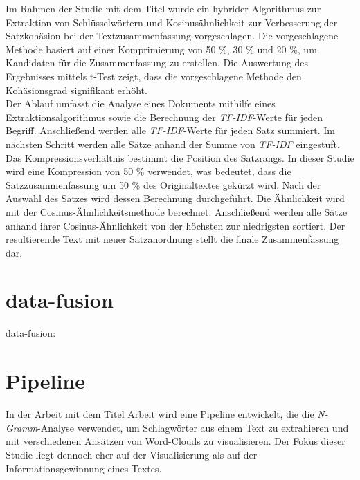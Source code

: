 Im Rahmen der Studie mit dem Titel \cite{darmawan2015hybrid} wurde ein hybrider Algorithmus zur Extraktion von Schlüsselwörtern und Kosinusähnlichkeit zur Verbesserung der Satzkohäsion bei der Textzusammenfassung vorgeschlagen. Die vorgeschlagene Methode basiert auf einer Komprimierung von 50 \%, 30 \% und 20 \%, um Kandidaten für die Zusammenfassung zu erstellen. Die Auswertung des Ergebnisses mittels t-Test zeigt, dass die vorgeschlagene Methode den Kohäsionsgrad signifikant erhöht.\\
Der Ablauf umfasst die Analyse eines Dokuments mithilfe eines Extraktionsalgorithmus sowie die Berechnung der \emph{TF-IDF}-Werte für jeden Begriff. Anschließend werden alle \emph{TF-IDF}-Werte für jeden Satz summiert. Im nächsten Schritt werden alle Sätze anhand der Summe von \emph{TF-IDF} eingestuft. Das Kompressionsverhältnis bestimmt die Position des Satzrangs. In dieser Studie wird eine Kompression von 50 \% verwendet, was bedeutet, dass die Satzzusammenfassung um 50 \% des Originaltextes gekürzt wird. Nach der Auswahl des Satzes wird dessen Berechnung durchgeführt. Die Ähnlichkeit wird mit der Cosinus-Ähnlichkeitsmethode berechnet. Anschließend werden alle Sätze anhand ihrer Cosinus-Ähnlichkeit von der höchsten zur niedrigsten sortiert. Der resultierende Text mit neuer Satzanordnung stellt die finale Zusammenfassung dar.\\

\section{data-fusion}
data-fusion: \cite{famili1997data} \cite{frank2005comparing} \cite{bohne2013data}
\newpage

\section{Pipeline}
In der Arbeit mit dem Titel \cite{pirk2019implementierung} Arbeit wird eine Pipeline entwickelt, die die \emph{N-Gramm}-Analyse verwendet, um Schlagwörter aus einem Text zu extrahieren und mit verschiedenen Ansätzen von Word-Clouds zu visualisieren. Der Fokus dieser Studie liegt dennoch eher auf der Visualisierung als auf der Informationsgewinnung eines Textes.\\

